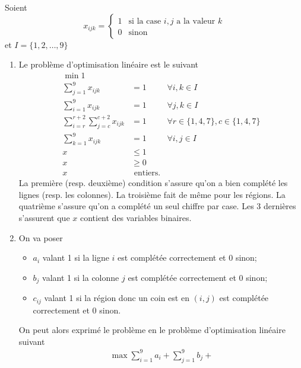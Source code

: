 \begin{enumerate}
    \begin{solution}
      Soient
      \[ x_{ijk} =
        \begin{cases}
          1 & \text{si la case }i, j\text{ a la valeur }k\\
          0 & \text{sinon}
        \end{cases}
      \]
      et $I = \{1,2,\ldots,9\}$
      \begin{enumerate}
        \item Le problème d'optimisation linéaire est le suivant
          \begin{align*}
            \min 1\\
            \sum_{j=1}^9 x_{ijk} & = 1 & \forall i,k \in I\\
            \sum_{i=1}^9 x_{ijk} & = 1 & \forall j,k \in I\\
            \sum_{i=r}^{r+2}\sum_{j=c}^{c+2} x_{ijk} & = 1
            & \forall r \in \{1,4,7\}, c \in \{1,4,7\}\\
            \sum_{k=1}^9 x_{ijk} & = 1 & \forall i,j \in I\\
            x & \leq 1\\
            x & \geq 0\\
            x & \text{ entiers}.
          \end{align*}
          La première (resp. deuxième) condition s'assure qu'on a bien complété
          les lignes (resp. les colonnes).
          La troisième fait de même pour les régions.
          La quatrième s'assure qu'on a complété un seul chiffre par
          case.
          Les 3 dernières s'assurent que $x$ contient des variables binaires.
        \item
          On va poser
          \begin{itemize}
            \item $a_i$ valant 1 si la ligne $i$ est complétée correctement
              et 0 sinon;
            \item $b_j$ valant 1 si la colonne $j$ est complétée correctement
              et 0 sinon;
            \item $c_{ij}$ valant 1 si la région donc un coin est en
              $(i,j)$ est complétée correctement
              et 0 sinon.
          \end{itemize}
          On peut alors exprimé le problème en le problème d'optimisation
          linéaire suivant
          \begin{align*}
            \max \sum_{i=1}^9 a_i + \sum_{j=1}^9 b_j +

\end{align*}
\end{enumerate}
\end{solution}
\end{enumerate}
